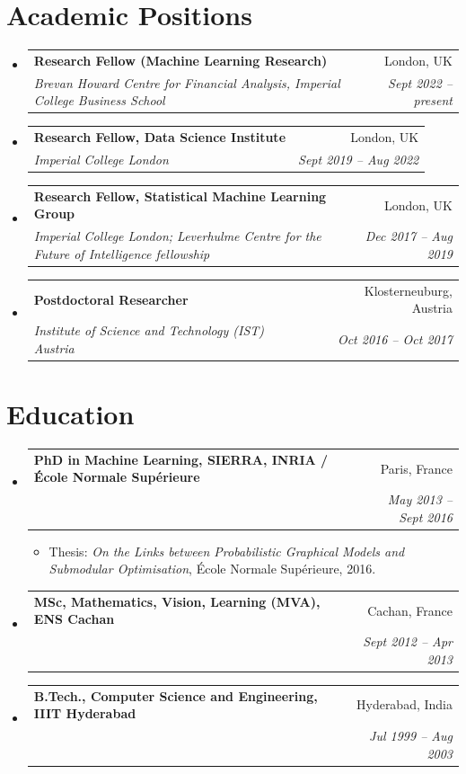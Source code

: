 \documentclass[a4paper,11pt]{article}
\makeatletter
\newcommand{\resumeSubheading}[4]{%
  \vspace{2pt}\item
    \begin{tabular*}{0.98\textwidth}[t]{l@{\extracolsep{\fill}}r}
      \textbf{#1} & #2 \\
      \textit{\small#3} & \textit{\small #4} \\
    \end{tabular*}\vspace{-4pt}%
}
\newcommand{\resumeSubHeadingListStart}{\begin{itemize}[leftmargin=0.1in, label={}, topsep=2pt]}
\newcommand{\resumeSubHeadingListEnd}{\end{itemize}}
\makeatother
\begin{document}
\section{Academic Positions}
\resumeSubHeadingListStart
  \resumeSubheading
    {Research Fellow (Machine Learning Research)}{London, UK}
    {Brevan Howard Centre for Financial Analysis, Imperial College Business School}{Sept 2022 -- present}
  \resumeSubheading
    {Research Fellow, Data Science Institute}{London, UK}
    {Imperial College London}{Sept 2019 -- Aug 2022}
  \resumeSubheading
    {Research Fellow, Statistical Machine Learning Group}{London, UK}
    {Imperial College London; Leverhulme Centre for the Future of Intelligence fellowship}{Dec 2017 -- Aug 2019}
  \resumeSubheading
    {Postdoctoral Researcher}{Klosterneuburg, Austria}
    {Institute of Science and Technology (IST) Austria}{Oct 2016 -- Oct 2017}
\resumeSubHeadingListEnd

\section{Education}
\resumeSubHeadingListStart
  \resumeSubheading
    {PhD in Machine Learning, SIERRA, INRIA / \'Ecole Normale Sup\'erieure}{Paris, France}
    {}{May 2013 -- Sept 2016}
    \begin{itemize}[leftmargin=0.25in, topsep=1pt, itemsep=0pt]\item\small Thesis: \textit{On the Links between Probabilistic Graphical Models and Submodular Optimisation}, \'Ecole Normale Sup\'erieure, 2016.\end{itemize}\vspace{-4pt}
  \resumeSubheading
    {MSc, Mathematics, Vision, Learning (MVA), ENS Cachan}{Cachan, France}
    {}{Sept 2012 -- Apr 2013}
  \resumeSubheading
    {B.Tech., Computer Science and Engineering, IIIT Hyderabad}{Hyderabad, India}
    {}{Jul 1999 -- Aug 2003}
\resumeSubHeadingListEnd

\end{document}
